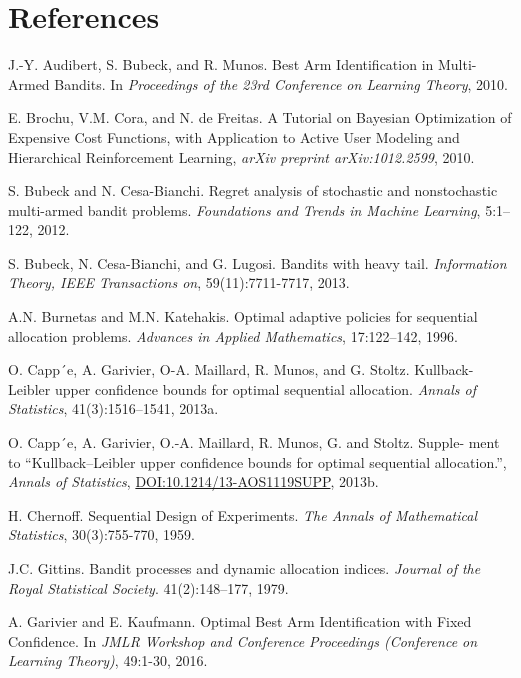 \documentclass[11pt,]{article}
\begin{document}
\newpage

\section{References}\label{references}

J.-Y. Audibert, S. Bubeck, and R. Munos. Best Arm Identification in
Multi-Armed Bandits. In \emph{Proceedings of the 23rd Conference on
Learning Theory}, 2010.\par

E. Brochu, V.M. Cora, and N. de Freitas. A Tutorial on Bayesian
Optimization of Expensive Cost Functions, with Application to Active
User Modeling and Hierarchical Reinforcement Learning, \emph{arXiv
preprint arXiv:1012.2599}, 2010. \par

S. Bubeck and N. Cesa-Bianchi. Regret analysis of stochastic and
nonstochastic multi-armed bandit problems. \emph{Foundations and Trends
in Machine Learning}, 5:1--122, 2012.\par

S. Bubeck, N. Cesa-Bianchi, and G. Lugosi. Bandits with heavy tail.
\emph{Information Theory, IEEE Transactions on}, 59(11):7711-7717,
2013.\par

A.N. Burnetas and M.N. Katehakis. Optimal adaptive policies for
sequential allocation problems. \emph{Advances in Applied Mathematics},
17:122--142, 1996.\par

O. Capp´e, A. Garivier, O-A. Maillard, R. Munos, and G. Stoltz.
Kullback-Leibler upper confidence bounds for optimal sequential
allocation. \emph{Annals of Statistics}, 41(3):1516--1541, 2013a.\par

O. Capp´e, A. Garivier, O.-A. Maillard, R. Munos, G. and Stoltz. Supple-
ment to ``Kullback--Leibler upper confidence bounds for optimal
sequential allocation.'', \emph{Annals of Statistics},
\url{DOI:10.1214/13-AOS1119SUPP}, 2013b. \par

H. Chernoff. Sequential Design of Experiments. \emph{The Annals of
Mathematical Statistics}, 30(3):755-770, 1959. \par

J.C. Gittins. Bandit processes and dynamic allocation indices.
\emph{Journal of the Royal Statistical Society}. 41(2):148--177,
1979.\par

A. Garivier and E. Kaufmann. Optimal Best Arm Identification with Fixed
Confidence. In \emph{JMLR Workshop and Conference Proceedings
(Conference on Learning Theory)}, 49:1-30, 2016.\par
\end{document}
